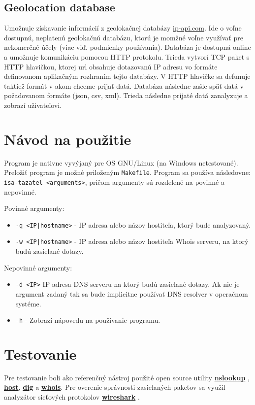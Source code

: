 \documentclass[a4paper, 11pt]{article}
\begin{document}
\subsection{Geolocation database} Umožnuje získavanie informácií z geolokačnej databázy \href{ip-api}{ip-api.com}. Ide o voľne dostupnú, neplatenú geolokačnú databázu, ktorú je momžné voľne využívať pre nekomerčné účely (viac viď. podmienky používania\cite{ip_api_terms}). Databáza je dostupná online a umožnuje komunikáciu pomocou HTTP protokolu. Trieda vytvorí TCP paket s HTTP hlavičkou, ktorej url obsahuje dotazovanú IP adresu vo formáte definovanom aplikačným rozhraním tejto databázy. V HTTP hlavičke sa defunuje taktiež formát v akom chceme prijať datá. Databáza následne zašle späť datá v požadovanom formáte (json, csv, xml). Trieda následne prijaté datá zanalyzuje a zobrazí uživateľovi.

\section{Návod na použitie}
Program je nativne vyvýjaný pre OS GNU/Linux (na Windows netestované). Preložiť program je možné priloženým \texttt{Makefile}. Program sa používa následovne: \texttt{isa-tazatel <arguments>}, pričom argumenty sú rozdelené na povinné a nepovinné.

Povinné argumenty:
\begin{itemize}
	\item\texttt{-q <IP|hostname>} - IP adresa alebo názov hostiteľa, ktorý bude analyzovaný.
	\item \texttt{-w <IP|hostname>} - IP adresa alebo názov hostiteľa Whois serveru, na ktorý budú zasielané dotazy.
\end{itemize}

Nepovinné argumenty:
\begin{itemize}
	\item \texttt{-d <IP>} IP adresa DNS serveru na ktorý budú zasielané dotazy. Ak nie je argument zadaný tak sa bude implicitne používať DNS resolver v operačnom systéme.
	\item \texttt{-h} - Zobrazí nápovedu na používanie programu.
\end{itemize}


\section{Testovanie}

Pre testovanie boli ako referenčný nástroj použité open source utility \href{https://linux.die.net/man/1/nslookup}{\textbf{nslookup}} , \href{https://linux.die.net/man/1/host}{\textbf{host}}, \href{https://linux.die.net/man/1/dig}{\textbf{dig}} a \href{https://linux.die.net/man/1/whois}{\textbf{whois}}. Pre overenie správnosti zasielaných paketov sa využil analyzátor sieťových protokolov \href{https://www.wireshark.org/}{\textbf{wireshark}} .
\end{document}
